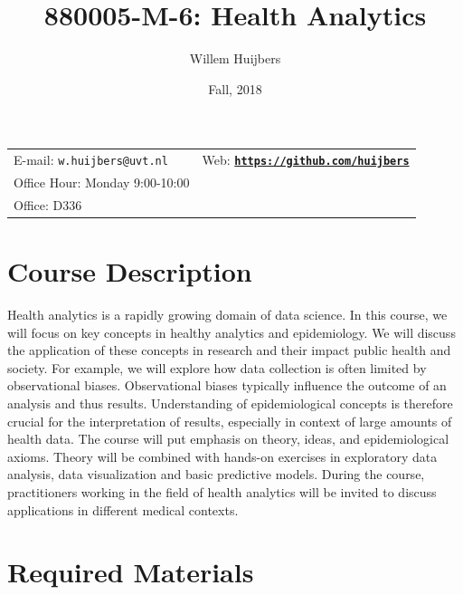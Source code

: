 \documentclass[11pt]{article}
\title{880005-M-6: Health Analytics}
\author{Willem Huijbers}
\date{Fall, 2018}
\newcommand{\blankline}{\quad\pagebreak[2]}
\begin{document}
\maketitle

\blankline

\begin{tabular*}{.93\textwidth}{@{\extracolsep{\fill}}lr}


E-mail: \texttt{w.huijbers@uvt.nl} & Web: \href{https://github.com/huijbers}{\tt\bf https://github.com/huijbers}  \\

Office Hour: Monday 9:00-10:00  \\
Office: D336  \\
\hline
\end{tabular*}

\vspace{5 mm}


\section*{Course Description}

Health analytics is a rapidly growing domain of data science. In this course, we will focus on key concepts in healthy analytics and epidemiology. We will discuss the application of these concepts in research and their impact public health and society. For example, we will explore how data collection is often limited by observational biases. Observational biases typically influence the outcome of an analysis and thus results. Understanding of epidemiological concepts is therefore crucial for the interpretation of results, especially in context of large amounts of health data. The course will put emphasis on theory, ideas, and epidemiological axioms. Theory will be combined with hands-on exercises in exploratory data analysis, data visualization and basic predictive models. During the course, practitioners working in the field of health analytics will be invited to discuss applications in different medical contexts.
\bigskip

\section*{Required Materials} 
\end{document}
